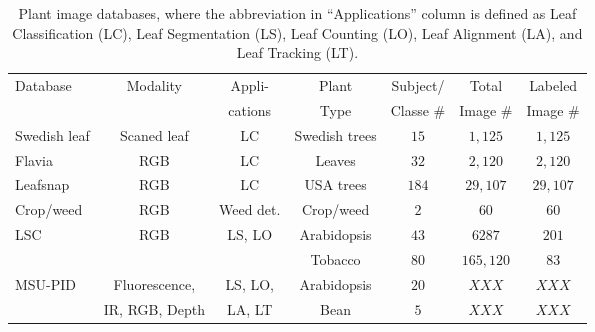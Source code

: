 \begin{table*}[t!]
	\centering
	\caption{Plant image databases, where the abbreviation in ``Applications'' column is defined as Leaf Classification (LC), Leaf Segmentation (LS), Leaf Counting (LO), Leaf Alignment (LA), and Leaf Tracking (LT).}
	\begin{tabular}{l|c|c|c|c|c|c}
		\hline
		\multirow{2}{*}{Database}&  \multirow{2}{*}{Modality}  & Appli-& Plant & Subject/ &Total  &  Labeled   \\ 						
			&         & cations &            Type         &       Classe \#         &  Image \#    & Image \# \\ \hline
		
Swedish leaf &  Scaned leaf & LC& Swedish trees & $15$ & $1,125$ & $1,125$ \\ \hline
Flavia& RGB  & LC& Leaves & $32$  & $2,120$ & $2,120$ \\ \hline
Leafsnap  & RGB & LC& USA trees & $184$ & $29,107$  &  $29,107$ \\ \hline
Crop/weed &  RGB &Weed det. & Crop/weed & $2$  & $60$ & $60$ \\ \hline
\multirow{2}{*}{LSC} & \multirow{2}{*}{RGB}  & \multirow{2}{*}{LS, LO} & Arabidopsis &  $43$ & $6287$ & $201$ \\ \cline{4-7}
							    &  & & Tobacco & $80$ & $165,120$ & $83$ \\ \hline
\multirow{2}{*}{MSU-PID}  & Fluorescence,  & LS, LO, & Arabidopsis &  $20$ & $XXX$ & $XXX$ \\ \cline{4-7}
							    & IR, RGB, Depth & LA, LT & Bean & $5$ & $XXX$ & $XXX$ \\ \hline
	       \hline
	\end{tabular}
	\label{tab:database}
\end{table*}
